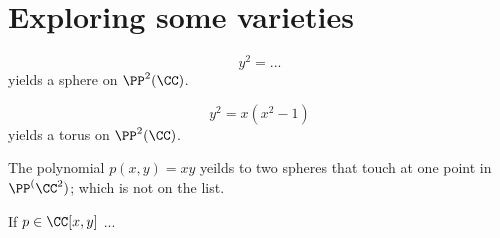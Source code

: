 \newpage
\section{Exploring some varieties}

\begin{exmp}
	\[
		y^2 = ...
	\]
	yields a sphere on $\PP^2(\CC)$.
\end{exmp}

\begin{exmp}
	\[
		y^2 = x(x^2 - 1)
	\]
	yields a torus on $\PP^2(\CC)$.
\end{exmp}

\begin{thm}

\end{thm}

\begin{exmp}
	The polynomial $p(x, y) = xy$ yeilds to two spheres that touch at one point in $\PP^(\CC^2)$; which is not on the list.
\end{exmp}

\begin{thm}
	If $p \in \CC[x, y]$ ...
\end{thm}
